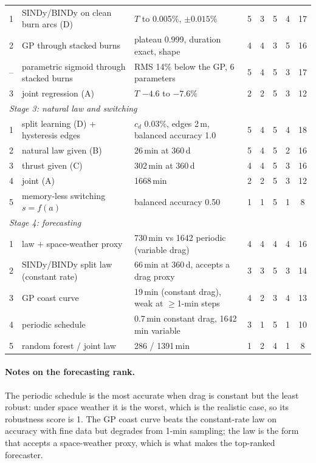 \documentclass[11pt,a4paper]{article}
\begin{document}
\begin{table}[H]
\begin{tabularx}{\textwidth}{clXccccc}
1 & SINDy/BINDy on clean burn arcs (D) & $T$ to 0.005\%, $\pm0.015\%$ & 5 & 3 & 5 & 4 & 17\\
2 & GP through stacked burns & plateau 0.999, duration exact, shape & 4 & 4 & 3 & 5 & 16\\
-- & parametric sigmoid through stacked burns & RMS 14\% below the GP, 6 parameters & 5 & 4 & 5 & 3 & 17\\
3 & joint regression (A) & $T$ $-4.6$ to $-7.6\%$ & 2 & 2 & 5 & 3 & 12\\\midrule
\multicolumn{8}{l}{\textit{Stage 3: natural law and switching}}\\
1 & split learning (D) + hysteresis edges & $c_d$ 0.03\%, edges 2\,m, balanced accuracy 1.0 & 5 & 4 & 5 & 4 & 18\\
2 & natural law given (B) & 26\,min at 360\,d & 5 & 4 & 5 & 2 & 16\\
3 & thrust given (C) & 302\,min at 360\,d & 4 & 4 & 5 & 3 & 16\\
4 & joint (A) & 1668\,min & 2 & 2 & 5 & 3 & 12\\
5 & memory-less switching $s = f(a)$ & balanced accuracy 0.50 & 1 & 1 & 5 & 1 & 8\\\midrule
\multicolumn{8}{l}{\textit{Stage 4: forecasting}}\\
1 & law + space-weather proxy & 730\,min vs 1642 periodic (variable drag) & 4 & 4 & 4 & 4 & 16\\
2 & SINDy/BINDy split law (constant rate) & 66\,min at 360\,d, accepts a drag proxy & 3 & 3 & 5 & 3 & 14\\
3 & GP coast curve & 19\,min (constant drag), weak at $\ge$1-min steps & 4 & 2 & 3 & 4 & 13\\
4 & periodic schedule & 0.7\,min constant drag, 1642\,min variable & 3 & 1 & 5 & 1 & 10\\
5 & random forest / joint law & 286 / 1391\,min & 1 & 2 & 4 & 1 & 8\\
\bottomrule
\end{tabularx}
\end{table}
\paragraph{Notes on the forecasting rank.} The periodic schedule is the most accurate when drag is constant but the
least robust: under space weather it is the worst, which is the realistic case, so its robustness score is 1. The GP
coast curve beats the constant-rate law on accuracy with fine data but degrades from 1-min sampling; the law is the
form that accepts a space-weather proxy, which is what makes the top-ranked forecaster.
\end{document}
